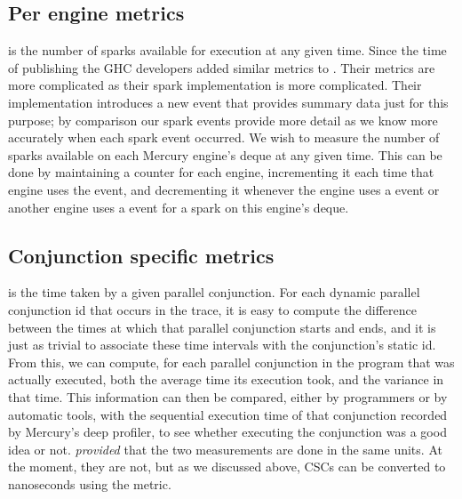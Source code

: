 

\subsection{Per engine metrics}

is the number of sparks available for execution at any given time.
Since the time of publishing \citet{bone:2011:tscope} the GHC developers
added similar metrics to \tscope.
Their metrics are more complicated as their spark implementation is more
complicated.
Their implementation introduces a new event that provides summary data just
for this purpose;
by comparison our spark events provide more detail as we know more accurately
when each spark event occurred.
We wish to measure the number of sparks available on each Mercury engine's
deque at any given time.
This can be done by maintaining a counter for each engine,
incrementing it each time that engine uses the  event,
and decrementing it whenever the engine uses a  event or
another engine uses a  event for a spark on this
engine's deque.


\subsection{Conjunction specific metrics}

 is the time taken by a given parallel conjunction.
For each dynamic parallel conjunction id that occurs in the trace,
it is easy to compute the difference between
the times at which that parallel conjunction starts and ends,
and it is just as trivial to associate these time intervals
with the conjunction's static id.
From this, we can compute,
for each parallel conjunction in the program that was actually executed,
both the average time its execution took,
and the variance in that time.
This information can then be compared,
either by programmers or by automatic tools,
with the sequential execution time of that conjunction recorded by
Mercury's deep profiler,
to see whether executing the conjunction was a good idea or not.
\emph{provided} that the two measurements are done in the same units.
At the moment, they are not, but as we discussed above,
CSCs can be converted to nanoseconds using the 
metric.

